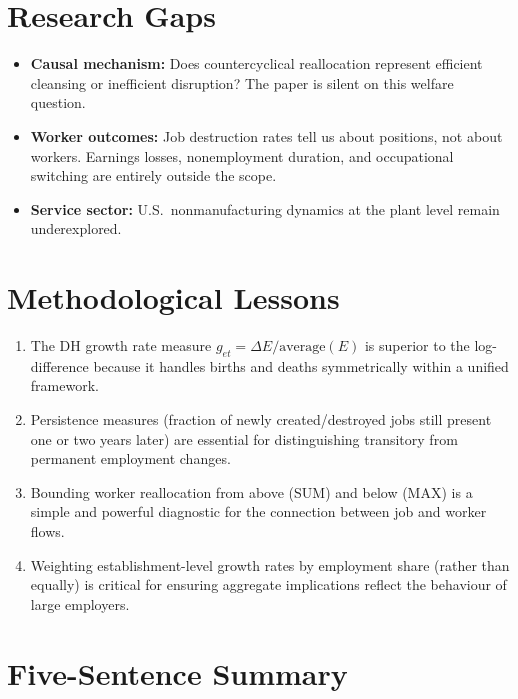 \section{Research Gaps}

\begin{itemize}
  \item \textbf{Causal mechanism:} Does countercyclical reallocation represent
    efficient cleansing or inefficient disruption? The paper is silent on this
    welfare question.
  \item \textbf{Worker outcomes:} Job destruction rates tell us about
    positions, not about workers. Earnings losses, nonemployment duration, and
    occupational switching are entirely outside the scope.
  \item \textbf{Service sector:} U.S.\ nonmanufacturing dynamics at the plant
    level remain underexplored.
\end{itemize}

\section{Methodological Lessons}

\begin{enumerate}
  \item The DH growth rate measure $g_{et}=\Delta E/\text{average}(E)$ is
    superior to the log-difference because it handles births and deaths
    symmetrically within a unified framework.
  \item Persistence measures (fraction of newly created/destroyed jobs still
    present one or two years later) are essential for distinguishing transitory
    from permanent employment changes.
  \item Bounding worker reallocation from above (SUM) and below (MAX) is a
    simple and powerful diagnostic for the connection between job and worker
    flows.
  \item Weighting establishment-level growth rates by employment share
    (rather than equally) is critical for ensuring aggregate implications
    reflect the behaviour of large employers.
\end{enumerate}

\section*{Five-Sentence Summary}

